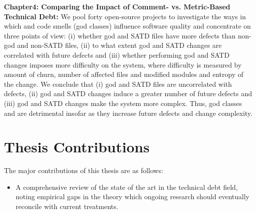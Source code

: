 \textbf{Chapter4: Comparing the Impact of Comment- vs. Metric-Based Technical Debt:} We pool forty open-source projects to investigate the ways in which \SATD and code smells (god classes) influence software quality and concentrate on three points of view: (i) whether god and SATD files have more defects than non-god and non-SATD files, (ii) to what extent god and SATD changes are correlated with future defects and (iii) whether performing god and SATD changes imposes more difficulty on the system, where difficulty is measured by amount of churn, number of affected files and modified modules and entropy of the change. We conclude that (i) god and SATD files are uncorrelated with defects, (ii) god and SATD changes induce a greater number of future defects and (iii) god and SATD changes make the system more complex. Thus, god classes and \SATD are detrimental insofar as they increase future defects and change complexity.

\section{Thesis Contributions}
The major contributions of this thesis are as follows:
\begin{itemize}
	\item A comprehensive review of the state of the art in the technical debt field, noting empirical gaps in the theory which ongoing research should eventually reconcile with current treatments.
	
\end{itemize}